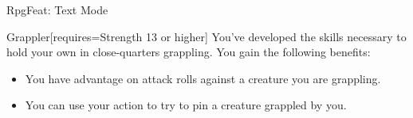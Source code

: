 \begin{ExampleBlock}{RpgFeat: Text Mode}
\begin{RpgFeat}{Grappler}[requires={Strength 13 or higher}]
    You've developed the skills necessary to hold your own in close-quarters grappling. You gain the following benefits:
    \begin{itemize}
        \item You have advantage on attack rolls against a creature you are grappling.
        \item You can use your action to try to pin a creature grappled by you.
    \end{itemize}
\end{RpgFeat}


\end{ExampleBlock}
